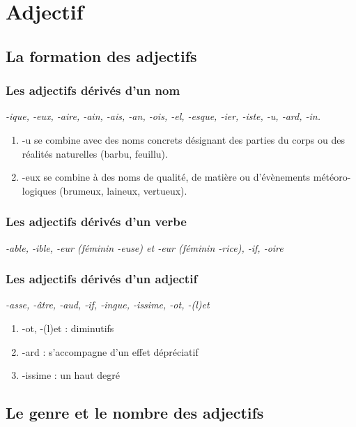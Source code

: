 \documentclass[UTF8]{report}
\begin{document}
\chapter{Adjectif}
\section{La formation des adjectifs}
\subsection{Les adjectifs dérivés d’un nom}
\textit{-ique, -eux, -aire, -ain, -ais, -an, -ois, -el, -esque, -ier, -iste, -u, -ard, -in.}
\begin{enumerate}
    \item -u se combine avec des noms concrets désignant des parties du corps ou des réalités naturelles (barbu, feuillu).
    \item -eux se combine à des noms de qualité, de matière ou d’évènements météoro- logiques (brumeux, laineux, vertueux).
\end{enumerate}

\subsection{Les adjectifs dérivés d’un verbe}
\textit{-able, -ible,  -eur (féminin -euse) et -eur (féminin -rice), -if, -oire}

\subsection{Les adjectifs dérivés d’un adjectif}
\textit{-asse, -âtre, -aud, -if, -ingue, -issime, -ot, -(l)et}

\begin{enumerate}
    \item -ot, -(l)et : diminutifs
    \item -ard : s’accompagne d’un effet dépréciatif
    \item -issime : un haut degré
\end{enumerate}



\section{ Le genre et le nombre des adjectifs}
\end{document}
